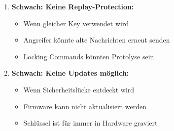 \documentclass[12pt,a4paper]{article}
\begin{document}
\begin{tcolorbox}[colback=solutionbg, colframe=black!30]
\begin{enumerate}[1.]
    \item \textbf{Schwach: Keine Replay-Protection:}
    \begin{itemize}
        \item Wenn gleicher Key verwendet wird
        \item Angreifer könnte alte Nachrichten erneut senden
        \item Locking Commands könnten Protolyse sein
    \end{itemize}
    
    \item \textbf{Schwach: Keine Updates möglich:}
    \begin{itemize}
        \item Wenn Sicherheitslücke entdeckt wird
        \item Firmware kann nicht aktualisiert werden
        \item Schlüssel ist für immer in Hardware graviert
    \end{itemize}
\end{enumerate}

\end{tcolorbox}
\end{document}
